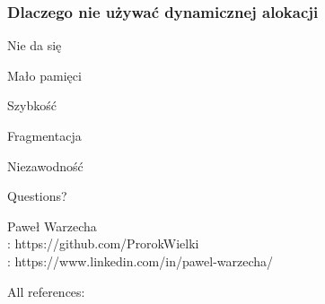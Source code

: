 \documentclass{beamer}
\makeatletter
\newenvironment{myitemize}{%
   \setlength{\topsep}{0pt}
   \setlength{\partopsep}{0pt}
   \renewcommand*{\@listi}{\leftmargin\leftmargini \parsep\z@ \topsep\z@ \itemsep\z@}
   \let\@listI\@listi
   \itemize
}{\enditemize}
\makeatother
\begin{document}
\begin{frame}[t]
    \frametitle{Dlaczego nie używać dynamicznej alokacji}
    \begin{myitemize}
        \item Nie da się
        \item Mało pamięci
        \item Szybkość
        \item Fragmentacja
        \item Niezawodność
    \end{myitemize}
\end{frame}
\begin{frame}
\begin{center}
    \vspace{20mm}
    \Huge Questions?
\end{center}

\vspace{35mm}
\hspace{55mm}\tiny Paweł Warzecha\\
\hspace{55mm}\tiny \faGithub :  https://github.com/ProrokWielki\\
\hspace{55mm}\tiny \faLinkedin :  https://www.linkedin.com/in/pawel-warzecha/\\
\end{frame}
\begin{frame}[t]
    All references:
    \AtNextBibliography{\tiny}
     \nocite{*}\printbibliography
\end{frame}
\end{document}
